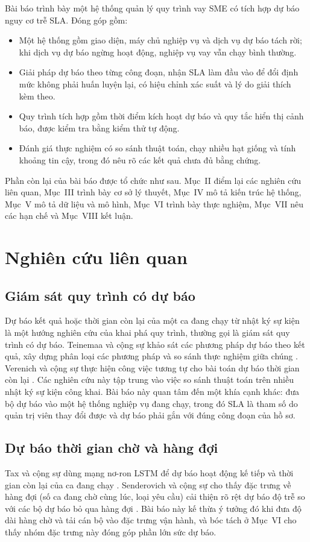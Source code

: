 \documentclass[journal]{IEEEtran}
\begin{document}
Bài báo trình bày một hệ thống quản lý quy trình vay SME có tích hợp dự báo nguy cơ trễ SLA. Đóng góp gồm:
\begin{itemize}
\item Một hệ thống gồm giao diện, máy chủ nghiệp vụ và dịch vụ dự báo tách rời; khi dịch vụ dự báo ngừng hoạt động, nghiệp vụ vay vẫn chạy bình thường.
\item Giải pháp dự báo theo từng công đoạn, nhận SLA làm đầu vào để đổi định mức không phải huấn luyện lại, có hiệu chỉnh xác suất và lý do giải thích kèm theo.
\item Quy trình tích hợp gồm thời điểm kích hoạt dự báo và quy tắc hiển thị cảnh báo, được kiểm tra bằng kiểm thử tự động.
\item Đánh giá thực nghiệm có so sánh thuật toán, chạy nhiều hạt giống và tính khoảng tin cậy, trong đó nêu rõ các kết quả chưa đủ bằng chứng.
\end{itemize}

Phần còn lại của bài báo được tổ chức như sau. Mục~II điểm lại các nghiên cứu liên quan, Mục~III trình bày cơ sở lý thuyết, Mục~IV mô tả kiến trúc hệ thống, Mục~V mô tả dữ liệu và mô hình, Mục~VI trình bày thực nghiệm, Mục~VII nêu các hạn chế và Mục~VIII kết luận.

\section{Nghiên cứu liên quan}
\subsection{Giám sát quy trình có dự báo}
Dự báo kết quả hoặc thời gian còn lại của một ca đang chạy từ nhật ký sự kiện là một hướng nghiên cứu của khai phá quy trình, thường gọi là giám sát quy trình có dự báo. Teinemaa và cộng sự khảo sát các phương pháp dự báo theo kết quả, xây dựng phân loại các phương pháp và so sánh thực nghiệm giữa chúng \cite{teinemaa2019}. Verenich và cộng sự thực hiện công việc tương tự cho bài toán dự báo thời gian còn lại \cite{verenich2019}. Các nghiên cứu này tập trung vào việc so sánh thuật toán trên nhiều nhật ký sự kiện công khai. Bài báo này quan tâm đến một khía cạnh khác: đưa bộ dự báo vào một hệ thống nghiệp vụ đang chạy, trong đó SLA là tham số do quản trị viên thay đổi được và dự báo phải gắn với đúng công đoạn của hồ sơ.

\subsection{Dự báo thời gian chờ và hàng đợi}
Tax và cộng sự dùng mạng nơ-ron LSTM để dự báo hoạt động kế tiếp và thời gian còn lại của ca đang chạy \cite{tax2017}. Senderovich và cộng sự cho thấy đặc trưng về hàng đợi (số ca đang chờ cùng lúc, loại yêu cầu) cải thiện rõ rệt dự báo độ trễ so với các bộ dự báo bỏ qua hàng đợi \cite{senderovich2015}. Bài báo này kế thừa ý tưởng đó khi đưa độ dài hàng chờ và tải cán bộ vào đặc trưng vận hành, và bóc tách ở Mục~VI cho thấy nhóm đặc trưng này đóng góp phần lớn sức dự báo.
\end{document}
